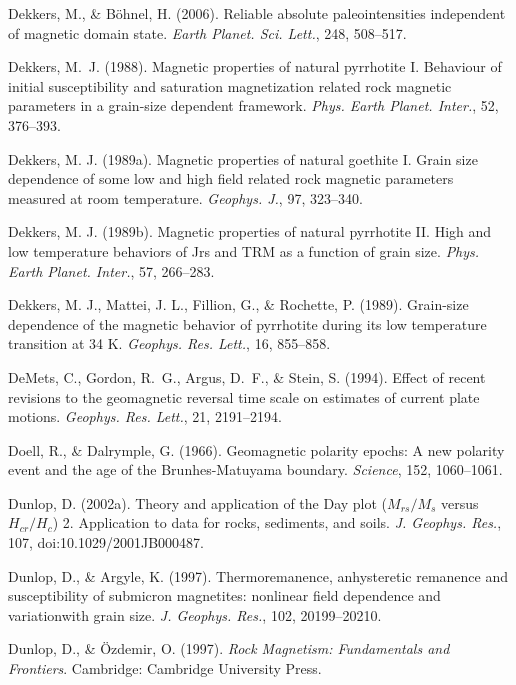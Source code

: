 \documentclass[,plain]{tauxe}
\begin{document}
\begin{thebibliography}{}
\bibitem{}%
Dekkers, M., \& B\"ohnel, H. (2006).
Reliable absolute paleointensities independent of magnetic domain state.
{\it Earth Planet. Sci. Lett.}, 248, 508--517.

\bibitem{}%
Dekkers, M.~J. (1988).
Magnetic properties of natural pyrrhotite {I}. Behaviour of initial susceptibility and saturation magnetization related rock magnetic parameters in a grain-size dependent framework.
{\it Phys. Earth Planet. Inter.}, 52, 376--393.

\bibitem{}%
Dekkers, M. J. (1989a). Magnetic properties of natural goethite I.
Grain size dependence of some low and high field related rock
magnetic parameters measured at room temperature. {\it Geophys. J.},
97, 323--340.

\bibitem{}%
Dekkers, M. J. (1989b). Magnetic properties of natural pyrrhotite II.
High and low temperature behaviors of Jrs and TRM as a function of
grain size. {\it Phys. Earth Planet. Inter.}, 57, 266--283.

\bibitem{}%
Dekkers, M. J., Mattei, J. L., Fillion, G., \& Rochette, P. (1989).
Grain-size dependence of the magnetic behavior of pyrrhotite during
its low temperature transition at 34 K. {\it Geophys. Res. Lett.},
16, 855--858.

\bibitem{}%
DeMets, C., Gordon, R.~G., Argus, D.~F., \& Stein, S. (1994).
Effect of recent revisions to the geomagnetic reversal time scale on estimates of current plate motions.
{\it Geophys. Res. Lett.}, 21, 2191--2194.

\bibitem{}%
Doell, R., \& Dalrymple, G. (1966).
Geomagnetic polarity epochs: A new polarity event and the age of the Brunhes-Matuyama boundary.
{\it Science}, 152, 1060--1061.

\bibitem{}%
Dunlop, D. (2002a).
Theory and application of the Day plot ($M_{rs}/M_s$ versus $H_{cr}/H_c$) 2. Application to data for rocks, sediments, and soils.
{\it J. Geophys. Res.}, 107, doi:10.1029/2001JB000487.

\bibitem{}%
Dunlop, D., \& Argyle, K. (1997).
Thermoremanence, anhysteretic remanence and susceptibility of submicron magnetites: nonlinear field dependence and variation\break with grain size.
{\it J. Geophys. Res.}, 102, 20199--20210.

\bibitem{}%
Dunlop, D., \& \"Ozdemir, O. (1997).
{\it Rock Magnetism: Fundamentals and Frontiers}.
Cambridge: Cambridge University Press.


\end{thebibliography}
\end{document}
